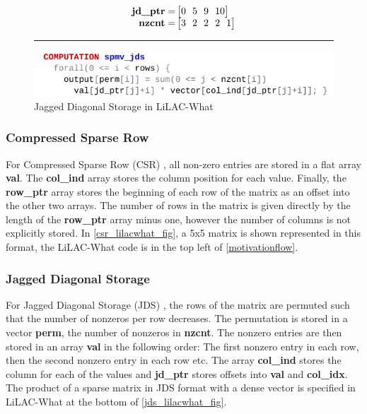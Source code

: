 \begin{figure}[p]
\begin{minipage}[b]{0.65\linewidth}
\begin{align*}
\text{\bf jd\_ptr} =& \begin{bmatrix}0\ \ 5\ \ 9\ \ 10\\\end{bmatrix}\\[-0.4em]
\text{\bf nzcnt} =& \begin{bmatrix}3\ \ 2\ \ 2\ \ 2\ \ 1\end{bmatrix}
\end{align*}
\end{minipage}
\vspace{0.5em}
\hrule
\vspace{0.3em}
\includegraphics[width=\linewidth]{figures/spmvjdswhat.pdf}
\vspace{-1.2em}
\caption{Jagged Diagonal Storage in LiLAC-What}
\label{jds_lilacwhat_fig}
\end{figure}

\subsubsection{Compressed Sparse Row}
For Compressed Sparse Row (CSR) \cite{doi:10.1137/1.9780898718003}, all non-zero
entries are stored in a flat array \textbf{val}.
The \textbf{col\_ind} array stores the column position for each value.
Finally, the \textbf{row\_ptr} array stores the beginning of each row of the
matrix as an offset into the other two arrays.
The number of rows in the matrix is given directly by the length of the
\textbf{row\_ptr} array minus one, however the number of columns is not
explicitly stored.
In \autoref{csr_lilacwhat_fig}, a 5x5 matrix is shown represented in this
format, the LiLAC-What code is in the top left of \autoref{motivationflow}.

\subsubsection{Jagged Diagonal Storage}
For Jagged Diagonal Storage (JDS) \cite{doi:10.1137/0910073}, the rows of the
matrix are permuted such that the number of nonzeros  per row  decreases. The
permutation is stored in a vector \textbf{perm}, the number of nonzeros in
\textbf{nzcnt}.
The nonzero entries are then stored in an array \textbf{val} in the following
order: The first nonzero entry in each row, then the second nonzero entry in
each row etc.
The array \textbf{col\_ind} stores the column for each of the values and
\textbf{jd\_ptr} stores offsets into \textbf{val} and \textbf{col\_idx}.
The product of a sparse matrix in JDS format with a dense vector is specified 
in LiLAC-What at the bottom of \autoref{jds_lilacwhat_fig}.

